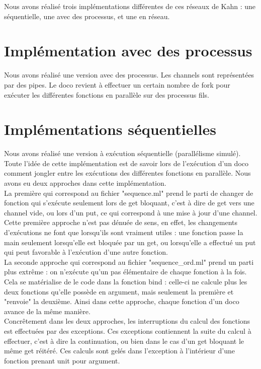 \documentclass[a4paper, 12pt, twoside]{report}
\begin{document}
Nous avons réalisé trois implémentations différentes de ces réseaux de Kahn : une séquentielle, une avec des processus, et 
une en réseau.

\section{Implémentation avec des processus}

Nous avons réalisé une version avec des processus. Les channels sont représentées par des pipes. Le doco revient à 
effectuer un certain nombre de fork pour exécuter les différentes fonctions en parallèle sur des processus fils.

\section{Implémentations séquentielles}

Nous avons réalisé une version à exécution séquentielle (parallélisme simulé). Toute l'idée de cette implémentation est de 
savoir lors de l'exécution d'un doco comment jongler entre les exécutions des différentes fonctions en parallèle. Nous avons 
eu deux approches dans cette implémentation.\\

La première qui correspond au fichier "sequence.ml" prend le parti de changer de 
fonction qui s'exécute seulement lors de get bloquant, c'est à dire de get vers une channel vide, ou lors d'un put, ce qui 
correspond à une mise à jour d'une channel. Cette première approche n'est pas dénuée de sens, en effet, les changements 
d'exécutions ne font que lorsqu'ils sont vraiment utiles : une fonction passe la main seulement lorsqu'elle est bloquée par un get, 
ou lorsqu'elle a effectué un put qui peut favorable à l'exécution d'une autre fonction.\\

La seconde approche qui correspond au fichier "sequence\_ord.ml" prend un parti plus extrême : on n'exécute qu'un pas élémentaire 
de chaque fonction à la fois. Cela se matérialise de le code dans la fonction bind : celle-ci ne calcule plus les deux fonctions 
qu'elle possède en argument, mais seulement la première et "renvoie" la deuxième. Ainsi dans cette approche, 
chaque fonction d'un doco avance de la même manière.\\

Concrêtement dans les deux approches, les interruptions du calcul des fonctions est effectuées par des exceptions. Ces exceptions 
contiennent la suite du calcul à effectuer, c'est à dire la continuation, ou bien dans le cas d'un get bloquant le même get réitéré. 
Ces calculs sont gelés dans l'exception à l'intérieur d'une fonction prenant unit pour argument.
\end{document}
